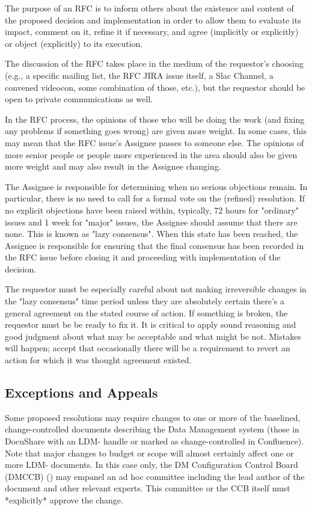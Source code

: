 The purpose of an RFC is to inform others about the existence and content of the proposed decision and implementation in order to allow them to evaluate its impact, comment on it, refine it if necessary, and agree (implicitly or explicitly) or object (explicitly) to its execution.

The discussion of the RFC takes place in the medium of the requestor's choosing (e.g., a specific mailing list, the RFC JIRA issue itself, a Slac Channel, a convened videocon, some combination of those, etc.), but the requestor should be open to private communications as well.

In the RFC process, the opinions of those who will be doing the work (and fixing any problems if something goes wrong) are given more weight. In some cases, this may mean that the RFC issue's Assignee passes to someone else. The opinions of more senior people or people more experienced in the area should also be given more weight and may also result in the Assignee changing.

The Assignee is responsible for determining when no serious objections remain.  In particular, there is no need to call for a formal vote on the (refined) resolution. If no explicit objections have been raised within, typically, 72 hours for "ordinary" issues and 1 week for "major" issues, the Assignee should assume that there are none. This is known as "lazy consensus". When this state has been reached, the Assignee is responsible for ensuring that the final consensus has been recorded in the RFC issue before closing it and proceeding with implementation of the decision.

The requestor must be especially careful about not making irreversible changes in the "lazy consensus" time period unless they are absolutely certain there's a general agreement on the stated course of action. If something is broken, the requestor must be be ready to fix it. It is critical to apply sound reasoning and good judgment about what may be acceptable and what might be not. Mistakes will happen; accept that occasionally there will be a requirement to revert an action for which it was thought agreement existed.

\subsection{Exceptions and Appeals}
Some proposed resolutions may require changes to one or more of the baselined, change-controlled documents describing the Data Management system (those in DocuShare with an LDM- handle or marked as change-controlled in Confluence).  Note that major changes to budget or scope will almost certainly affect one or more LDM- documents.  In this case only, the DM Configuration Control Board (DMCCB) ()  may empanel an ad hoc committee including the lead author of the document and other relevant experts. This committee or the CCB itself must *explicitly* approve the change.

